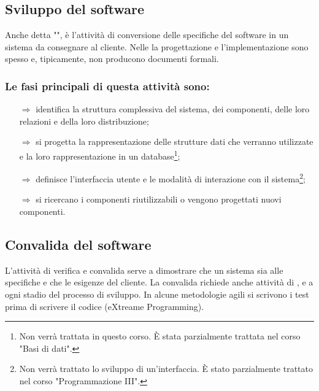 \subsection{Sviluppo del software}

Anche detta "", è l'attività
di conversione delle specifiche del software in un sistema da consegnare al cliente.
Nelle  la progettazione e l'implementazione
sono spesso  e, tipicamente, non producono documenti formali. 

\subsubsection{Le fasi principali di questa attività sono:}

\begin{itemize}
    \item [$\Rightarrow$]  identifica la struttura
    complessiva del sistema, dei componenti, delle loro relazioni e della loro distribuzione; 
    \item [$\Rightarrow$]  si progetta la rappresentazione
    delle strutture dati che verranno utilizzate e la loro rappresentazione in un database\footnote{Non verrà trattata
    in questo corso. È stata parzialmente trattata nel corso "Basi di dati".}; 
    \item [$\Rightarrow$]  definisce l'interfaccia 
    utente e le modalità di interazione con il sistema\footnote{Non verrà trattato lo sviluppo di un'interfaccia. È stato parzialmente trattato
    nel corso "Programmazione III".};
    \item [$\Rightarrow$]  si ricercano i componenti
    riutilizzabili o vengono progettati nuovi componenti.
\end{itemize}


\subsection{Convalida del software}

L'attività di verifica e convalida serve a dimostrare che un sistema sia 
 alle specifiche e che 
le esigenze del cliente.
La convalida richiede anche attività di ,  e 
a ogni stadio del processo di sviluppo. In alcune metodologie agili
si scrivono i test prima di scrivere il codice (eXtreame Programming).

